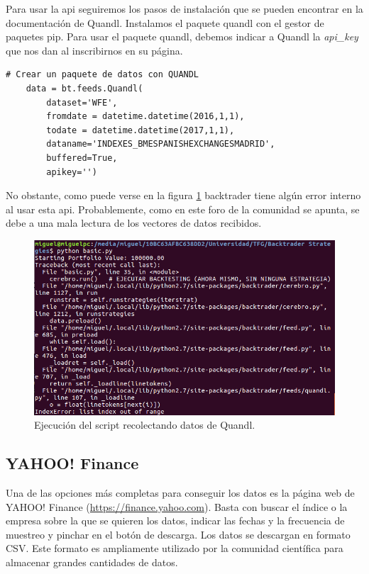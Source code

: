 \documentclass[12pt,a4paper]{article}
\begin{document}
		Para usar la api seguiremos los pasos de instalaci\'on que se pueden encontrar en la documentaci\'on\cite{quandldoc} de Quandl. Instalamos el paquete quandl con el gestor de paquetes pip. Para usar el paquete quandl, debemos indicar a Quandl la \textit{api\_key} que nos dan al inscribirnos en su p\'agina.\\
		
		\begin{lstlisting}[basicstyle=\tiny]
# Crear un paquete de datos con QUANDL
	data = bt.feeds.Quandl(
		dataset='WFE',
		fromdate = datetime.datetime(2016,1,1),
		todate = datetime.datetime(2017,1,1),
		dataname='INDEXES_BMESPANISHEXCHANGESMADRID',
		buffered=True,
		apikey='')
		\end{lstlisting}

			
			

		No obstante, como puede verse en la figura \ref{fig:quandl_install} backtrader tiene alg\'un error interno al usar esta api. Probablemente, como en este foro de la comunidad se apunta\cite{quandlerror}, se debe a una mala lectura de los vectores de datos recibidos.
		
			\begin{figure}[H]
				\centering
				\includegraphics[scale=1.2]{imagenes/quandl_install.png}
				\caption{Ejecuci\'on del script recolectando datos de Quandl.}
				\label{fig:quandl_install}
			\end{figure}
			
			
		\subsection{YAHOO! Finance}
				
		Una de las opciones m\'as completas para conseguir los datos es la p\'agina web de YAHOO! Finance (\url{https://finance.yahoo.com}). Basta con buscar el \'indice o la empresa sobre la que se quieren los datos, indicar las fechas y la frecuencia de muestreo y pinchar en el bot\'on de descarga. Los datos se descargan en formato CSV. Este formato es ampliamente utilizado por la comunidad cient\'ifica para almacenar grandes cantidades de datos.\\
				
\end{document}
